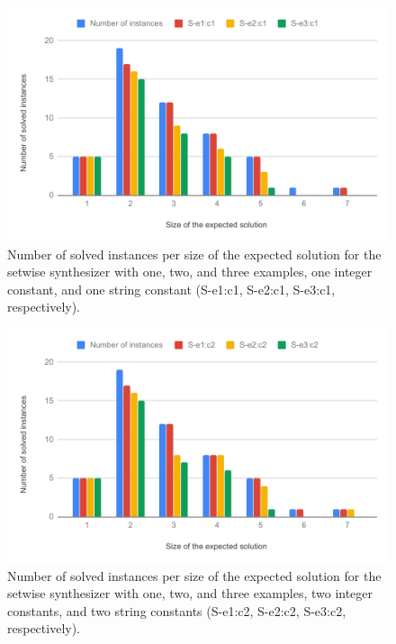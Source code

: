 \begin{figure}
  \centering
  \includegraphics[width=1.0\textwidth]{assets/bar-chart-solved-setwise-c1.pdf}
  \caption{Number of solved instances per size of the expected solution for
    the setwise synthesizer with one, two, and three examples, one integer
    constant, and one string constant (S-e1:c1, S-e2:c1, S-e3:c1, respectively).}
  \label{fig:bar-chart-solved-setwise-c1}
\end{figure}

\begin{figure}
  \centering
  \includegraphics[width=1.0\textwidth]{assets/bar-chart-solved-setwise-c2.pdf}
  \caption{Number of solved instances per size of the expected solution for
    the setwise synthesizer with one, two, and three examples, two integer
    constants, and two string constants (S-e1:c2, S-e2:c2, S-e3:c2,
    respectively).}
  \label{fig:bar-chart-solved-setwise-c2}
\end{figure}

